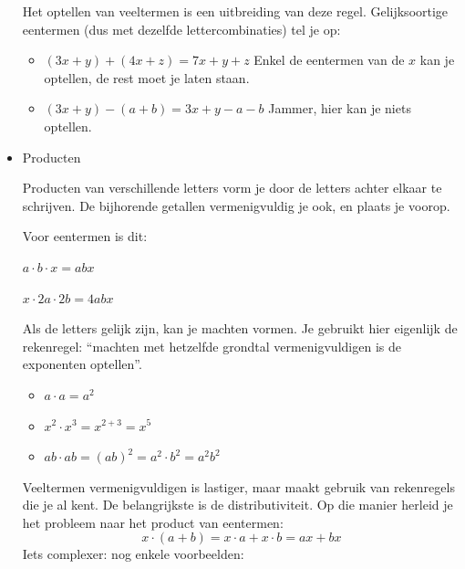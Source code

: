 \begin{itemize}
	\noindent Het optellen van veeltermen is een uitbreiding van deze
	regel. Gelijksoortige eentermen (dus met dezelfde lettercombinaties)
	tel je op: 
	\begin{itemize}
		\item \noindent $(3x+y)+(4x+z)=7x+y+z$ Enkel de eentermen van de $x$ kan
		je optellen, de rest moet je laten staan. 
		\item \noindent $(3x+y)-(a+b)=3x+y-a-b$ Jammer, hier kan je niets optellen.
	\end{itemize}
	
	\item{Producten}
	
	Producten van verschillende letters vorm je door de letters achter
	elkaar te schrijven. De bijhorende getallen vermenigvuldig je ook,
	en plaats je voorop. 
	
	\noindent Voor eentermen is dit:
	
	\textbullet{} $a\cdot b\cdot x=abx$ 
	
	\textbullet{} $x\cdot2a\cdot2b=4abx$ \medskip{}
	
	
	\noindent Als de letters gelijk zijn, kan je machten vormen. Je gebruikt
	hier eigenlijk de rekenregel: ``machten met hetzelfde grondtal vermenigvuldigen
	is de exponenten optellen''.
	\begin{itemize}
		\item \noindent $a\cdot a=a^{2}$
		\item \noindent $x^{2}\cdot x^{3}=x^{2+3}=x^{5}$
		\item \noindent $ab\cdot ab=(ab)^{2}=a^{2}\cdot b^{2}=a^{2}b^{2}$
	\end{itemize}
	\noindent Veeltermen vermenigvuldigen is lastiger, maar maakt gebruik
	van rekenregels die je al kent. De belangrijkste is de distributiviteit.
	Op die manier herleid je het probleem naar het product van eentermen:
	\begin{equation*}
	x\cdot(a+b)=x\cdot a+x\cdot b=ax+bx
	\end{equation*}
	\noindent Iets complexer: nog enkele voorbeelden:
	

\end{itemize}
